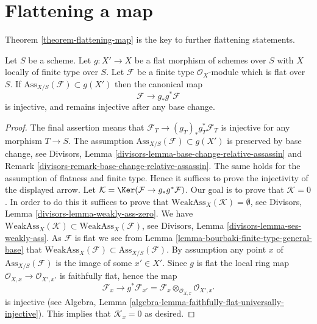 \section{Flattening a map}
\label{section-fattening-map}

\noindent
Theorem \ref{theorem-flattening-map}
is the key to further flattening statements.

\begin{lemma}
\label{lemma-universally-separating}
Let $S$ be a scheme.
Let $g : X' \to X$ be a flat morphism of schemes over $S$
with $X$ locally of finite type over $S$.
Let $\mathcal{F}$ be a finite type $\mathcal{O}_X$-module
which is flat over $S$. If $\text{Ass}_{X/S}(\mathcal{F}) \subset g(X')$
then the canonical map
$$
\mathcal{F} \longrightarrow g_*g^*\mathcal{F}
$$
is injective, and remains injective after any base change.
\end{lemma}

\begin{proof}
The final assertion means that $\mathcal{F}_T \to (g_T)_*g_T^*\mathcal{F}_T$
is injective for any morphism $T \to S$. The assumption
$\text{Ass}_{X/S}(\mathcal{F}) \subset g(X')$ is preserved by base change, see
Divisors, Lemma \ref{divisors-lemma-base-change-relative-assassin} and
Remark \ref{divisors-remark-base-change-relative-assassin}.
The same holds for the assumption of flatness and finite type.
Hence it suffices to prove the injectivity of the displayed arrow.
Let $\mathcal{K} = \Ker(\mathcal{F} \to g_*g^*\mathcal{F})$.
Our goal is to prove that $\mathcal{K} = 0$.
In order to do this it suffices to prove that
$\text{WeakAss}_X(\mathcal{K}) = \emptyset$, see
Divisors, Lemma \ref{divisors-lemma-weakly-ass-zero}.
We have
$\text{WeakAss}_X(\mathcal{K}) \subset \text{WeakAss}_X(\mathcal{F})$, see
Divisors, Lemma \ref{divisors-lemma-ses-weakly-ass}.
As $\mathcal{F}$ is flat we see from
Lemma \ref{lemma-bourbaki-finite-type-general-base}
that $\text{WeakAss}_X(\mathcal{F}) \subset \text{Ass}_{X/S}(\mathcal{F})$.
By assumption any point $x$ of $\text{Ass}_{X/S}(\mathcal{F})$
is the image of some $x' \in X'$. Since $g$ is flat the
local ring map $\mathcal{O}_{X, x} \to \mathcal{O}_{X', x'}$
is faithfully flat, hence the map
$$
\mathcal{F}_x
\longrightarrow
g^*\mathcal{F}_{x'} =
\mathcal{F}_x \otimes_{\mathcal{O}_{X, x}} \mathcal{O}_{X', x'}
$$
is injective (see
Algebra, Lemma \ref{algebra-lemma-faithfully-flat-universally-injective}).
This implies that $\mathcal{K}_x = 0$ as desired.
\end{proof}

